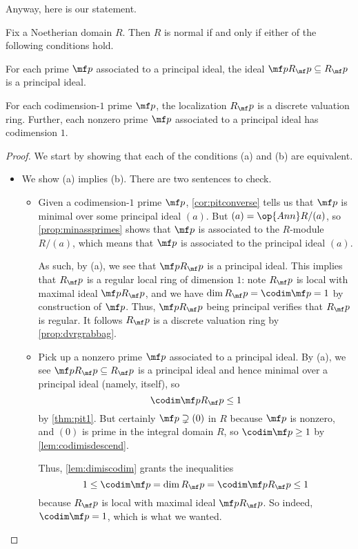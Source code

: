 Anyway, here is our statement.
\begin{theorem}
	Fix a Noetherian domain $R$. Then $R$ is normal if and only if either of the following conditions hold.
	\begin{listalph}
		\item For each prime $\mf p$ associated to a principal ideal, the ideal $\mf pR_\mf p\subseteq R_\mf p$ is a principal ideal.
		\item For each codimension-$1$ prime $\mf p$, the localization $R_\mf p$ is a discrete valuation ring. Further, each nonzero prime $\mf p$ associated to a principal ideal has codimension $1$.
	\end{listalph}
\end{theorem}
\begin{proof}
	We start by showing that each of the conditions (a) and (b) are equivalent.
	\begin{itemize}
		\item We show (a) implies (b). There are two sentences to check.
		\begin{itemize}
			\item Given a codimension-$1$ prime $\mf p$, \autoref{cor:pitconverse} tells us that $\mf p$ is minimal over some principal ideal $(a)$. But $(a)=\op{Ann}R/(a)$, so \autoref{prop:minassprimes} shows that $\mf p$ is associated to the $R$-module $R/(a)$, which means that $\mf p$ is associated to the principal ideal $(a)$.

			As such, by (a), we see that $\mf pR_\mf p$ is a principal ideal. This implies that $R_\mf p$ is a regular local ring of dimension $1$: note $R_\mf p$ is local with maximal ideal $\mf pR_\mf p$, and we have $\dim R_\mf p=\codim\mf p=1$ by construction of $\mf p$. Thus, $\mf pR_\mf p$ being principal verifies that $R_\mf p$ is regular. It follows $R_\mf p$ is a discrete valuation ring by \autoref{prop:dvrgrabbag}.

			\item Pick up a nonzero prime $\mf p$ associated to a principal ideal. By (a), we see $\mf pR_\mf p\subseteq R_\mf p$ is a principal ideal and hence minimal over a principal ideal (namely, itself), so
			\[\codim\mf pR_\mf p\le1\]
			by \autoref{thm:pit1}. But certainly $\mf p\supsetneq(0)$ in $R$ because $\mf p$ is nonzero, and $(0)$ is prime in the integral domain $R$, so $\codim\mf p\ge1$ by \autoref{lem:codimisdescend}.
			
			Thus, \autoref{lem:dimiscodim} grants the inequalities
			\[1\le\codim\mf p=\dim R_\mf p=\codim\mf pR_\mf p\le1\]
			because $R_\mf p$ is local with maximal ideal $\mf pR_\mf p$. So indeed, $\codim\mf p=1$, which is what we wanted.
		\end{itemize}


\end{itemize}
\end{proof}
